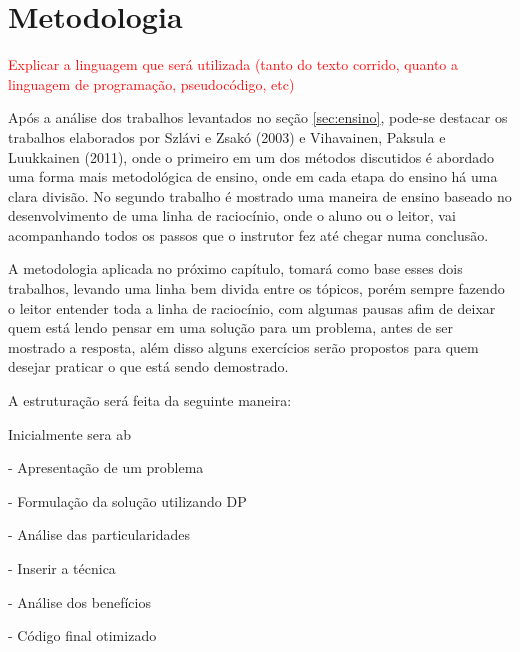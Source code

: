 
\chapter{Metodologia}
\label{chap:metodo}
\textcolor{red}{Explicar a linguagem que será utilizada (tanto do texto corrido, quanto a linguagem de programação, pseudocódigo, etc)}

Após a análise dos trabalhos levantados no seção \ref{sec:ensino}, pode-se destacar os trabalhos elaborados por Szlávi e Zsakó (2003) e Vihavainen, Paksula e Luukkainen (2011), onde o primeiro em um dos métodos discutidos é abordado uma forma mais metodológica de ensino, onde em cada etapa do ensino há uma clara divisão. No segundo trabalho é mostrado uma maneira de ensino baseado no desenvolvimento de uma linha de raciocínio, onde o aluno ou o leitor, vai acompanhando todos os passos que o instrutor fez até chegar numa conclusão.

A metodologia aplicada no próximo capítulo, tomará como base esses dois trabalhos, levando uma linha bem divida entre os tópicos, porém sempre fazendo o leitor entender toda a linha de raciocínio, com algumas pausas afim de deixar quem está lendo pensar em uma solução para um problema, antes de ser mostrado a resposta, além disso alguns exercícios serão propostos para quem desejar praticar o que está sendo demostrado.

A estruturação será feita da seguinte maneira:


Inicialmente sera ab

- Apresentação de um problema

- Formulação da solução utilizando DP

- Análise das particularidades

- Inserir a técnica

- Análise dos benefícios

- Código final otimizado

